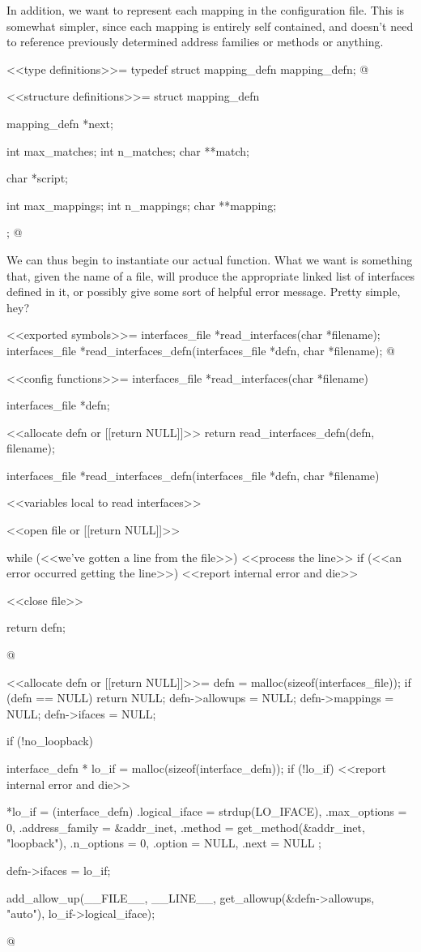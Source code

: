 \documentclass{article}
\begin{document}
In addition, we want to represent each mapping in the configuration
file. This is somewhat simpler, since each mapping is entirely self
contained, and doesn't need to reference previously determined address
families or methods or anything.

<<type definitions>>=
typedef struct mapping_defn mapping_defn;
@ 

<<structure definitions>>=
struct mapping_defn {
	mapping_defn *next;

	int max_matches;
	int n_matches;
	char **match;

	char *script;

	int max_mappings;
	int n_mappings;
	char **mapping;
};
@ 

We can thus begin to instantiate our actual function. What we want is
something that, given the name of a file, will produce the appropriate
linked list of interfaces defined in it, or possibly give some sort of
helpful error message. Pretty simple, hey?

<<exported symbols>>=
interfaces_file *read_interfaces(char *filename);
interfaces_file *read_interfaces_defn(interfaces_file *defn, char *filename);
@ 

<<config functions>>=
interfaces_file *read_interfaces(char *filename) {
	interfaces_file *defn;

	<<allocate defn or [[return NULL]]>>
	return read_interfaces_defn(defn, filename);
}

interfaces_file *read_interfaces_defn(interfaces_file *defn, char *filename) {
	<<variables local to read interfaces>>

	<<open file or [[return NULL]]>>

	while (<<we've gotten a line from the file>>) {
		<<process the line>>
	}
	if (<<an error occurred getting the line>>) {
		<<report internal error and die>>
	}

	<<close file>>

	return defn;
}
@ 

<<allocate defn or [[return NULL]]>>=
defn = malloc(sizeof(interfaces_file));
if (defn == NULL) {
	return NULL;
}
defn->allowups = NULL;
defn->mappings = NULL;
defn->ifaces = NULL;

if (!no_loopback) {
	interface_defn * lo_if = malloc(sizeof(interface_defn));
	if (!lo_if) {
		<<report internal error and die>>
	}

	*lo_if = (interface_defn){
	    .logical_iface = strdup(LO_IFACE),
	    .max_options = 0,
	    .address_family = &addr_inet,
	    .method = get_method(&addr_inet, "loopback"),
	    .n_options = 0,
	    .option = NULL,
	    .next = NULL
	};

	defn->ifaces = lo_if;

	add_allow_up(__FILE__, __LINE__, get_allowup(&defn->allowups, "auto"), lo_if->logical_iface);
}
@ 
\end{document}
